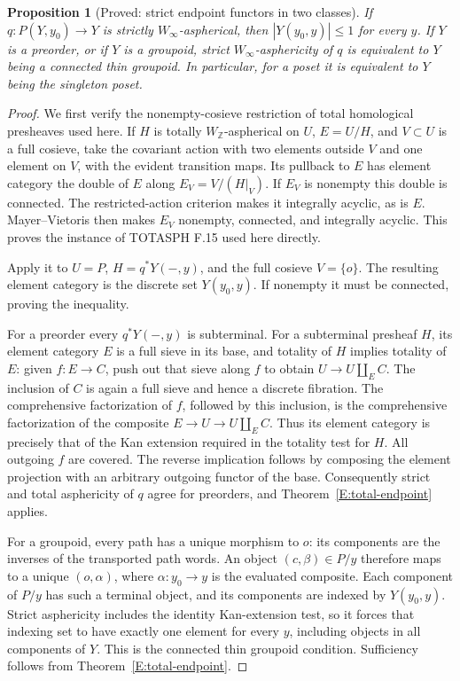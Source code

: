 \documentclass[11pt,a4paper]{article}
\newtheorem{proposition}[theorem]{Proposition}
\theoremstyle{definition}
\theoremstyle{remark}
\begin{document}
\begin{proposition}[Proved: strict endpoint functors in two classes]
\label{E:strict-cases}
If $q:P(Y,y_0)\to Y$ is strictly $W_\infty$-aspherical, then
$|Y(y_0,y)|\leq1$ for every $y$.  If $Y$ is a preorder, or if $Y$ is a
groupoid, strict $W_\infty$-asphericity of $q$ is equivalent to $Y$
being a connected thin groupoid.  In particular, for a poset it is
equivalent to $Y$ being the singleton poset.
\end{proposition}
\begin{proof}
We first verify the nonempty-cosieve restriction of total homological
presheaves used here.  If $H$ is totally $W_{\mathbb Z}$-aspherical on
$U$, $E=U/H$, and $V\subset U$ is a full cosieve, take the covariant
action with two elements outside $V$ and one element on $V$, with the
evident transition maps.  Its pullback to $E$ has element category the
double of $E$ along $E_V=V/(H|_V)$.  If $E_V$ is nonempty this double
is connected.  The restricted-action criterion makes it integrally
acyclic, as is $E$.  Mayer--Vietoris then makes $E_V$ nonempty,
connected, and integrally acyclic.  This proves the instance of
TOTASPH F.15 used here directly.

Apply it to $U=P$, $H=q^*Y(-,y)$, and the full cosieve $V=\{o\}$.
The resulting element category is the discrete set $Y(y_0,y)$.
If nonempty it must be connected, proving the inequality.

For a preorder every $q^*Y(-,y)$ is subterminal.  For a subterminal
presheaf $H$, its element category $E$ is a full sieve in its base,
and totality of $H$ implies totality of $E$: given $f:E\to C$, push
out that sieve along $f$ to obtain $U\to U\amalg_E C$.  The inclusion
of $C$ is again a full sieve and hence a discrete fibration.  The
comprehensive factorization of $f$, followed by this inclusion, is the
comprehensive factorization of the composite $E\to U\to U\amalg_E C$.
Thus its element category is precisely that of the Kan extension
required in the totality test for $H$.  All outgoing $f$ are covered.
The reverse implication follows by composing the element projection
with an arbitrary outgoing functor of the base.  Consequently strict
and total asphericity of $q$ agree for preorders, and
Theorem~\ref{E:total-endpoint} applies.

For a groupoid, every path has a unique morphism to $o$: its components
are the inverses of the transported path words.  An object
$(c,\beta)\in P/y$ therefore maps to a unique $(o,\alpha)$, where
$\alpha:y_0\to y$ is the evaluated composite.  Each component of
$P/y$ has such a terminal object, and its components are indexed by
$Y(y_0,y)$.  Strict asphericity includes the identity Kan-extension
test, so it forces that indexing set to have exactly one element for
every $y$, including objects in all components of $Y$.  This is the
connected thin groupoid condition.  Sufficiency follows from
Theorem~\ref{E:total-endpoint}.
\end{proof}
\end{document}
